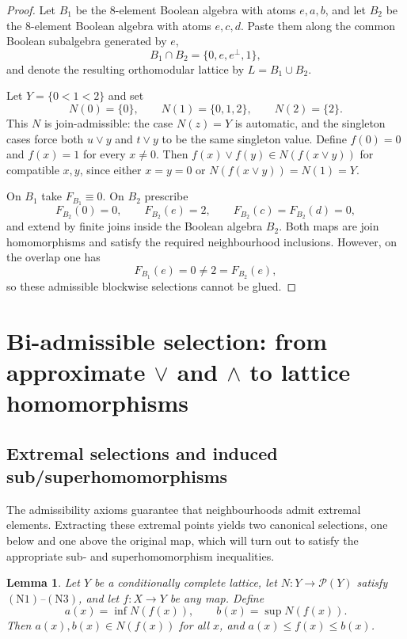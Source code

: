 \documentclass[11pt]{amsart}
\newtheorem{lemma}[theorem]{Lemma}
\theoremstyle{definition}
\newcommand{\join}{\vee}
\newcommand{\meet}{\wedge}
\newcommand{\Pow}{\mathcal{P}}
\newcommand{\NOne}{\ensuremath{\mathrm{(N1)}}}
\newcommand{\NThree}{\ensuremath{\mathrm{(N3)}}}
\begin{document}
\begin{proof}
Let $B_1$ be the $8$-element Boolean algebra with atoms $e,a,b$, and let $B_2$ be the $8$-element Boolean algebra with atoms $e,c,d$.
Paste them along the common Boolean subalgebra generated by $e$,
\[
B_1\cap B_2=\{0,e,e^\perp,1\},
\]
and denote the resulting orthomodular lattice by $L=B_1\cup B_2$.

Let $Y=\{0<1<2\}$ and set
\[
N(0)=\{0\},\qquad N(1)=\{0,1,2\},\qquad N(2)=\{2\}.
\]
This $N$ is join-admissible: the case $N(z)=Y$ is automatic, and the singleton cases force both $u\join y$ and $t\join y$ to be the same singleton value.
Define $f(0)=0$ and $f(x)=1$ for every $x\ne0$.
Then $f(x)\join f(y)\in N(f(x\join y))$ for compatible $x,y$, since either $x=y=0$ or $N(f(x\join y))=N(1)=Y$.

On $B_1$ take $F_{B_1}\equiv0$.
On $B_2$ prescribe
\[
F_{B_2}(0)=0,
\qquad F_{B_2}(e)=2,
\qquad F_{B_2}(c)=F_{B_2}(d)=0,
\]
and extend by finite joins inside the Boolean algebra $B_2$.
Both maps are join homomorphisms and satisfy the required neighbourhood inclusions.
However, on the overlap one has
\[
F_{B_1}(e)=0\ne2=F_{B_2}(e),
\]
so these admissible blockwise selections cannot be glued.
\end{proof}

\section{Bi-admissible selection: from approximate \texorpdfstring{$\join$ and $\meet$}{joins and meets} to lattice homomorphisms}

\subsection{Extremal selections and induced sub/superhomomorphisms}
The admissibility axioms guarantee that neighbourhoods admit extremal elements.
Extracting these extremal points yields two canonical selections, one below and one above the
original map, which will turn out to satisfy the appropriate sub- and superhomomorphism
inequalities.

\begin{lemma}\label{lem:ab}
Let $Y$ be a conditionally complete lattice, let $N\colon Y\to\Pow(Y)$ satisfy \NOne--\NThree, and let $f\colon X\to Y$ be any map.
Define
\[
a(x)=\inf N(f(x)),\qquad b(x)=\sup N(f(x)).
\]
Then $a(x),b(x)\in N(f(x))$ for all $x$, and $a(x)\le f(x)\le b(x)$.
\end{lemma}
\end{document}
